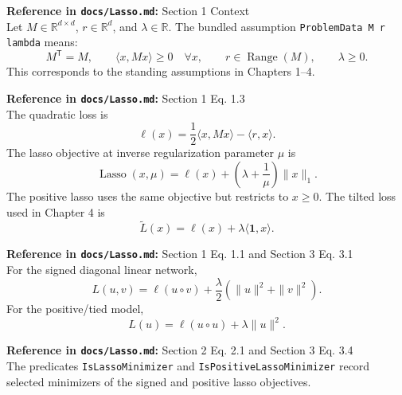 \begin{definition}\label{def:lassoProblemData}
  \textbf{Reference in \texttt{docs/Lasso.md}:} Section 1 Context\\
Let $M \in \mathbb{R}^{d \times d}$, $r \in \mathbb{R}^d$, and
$\lambda \in \mathbb{R}$.
The bundled assumption \texttt{ProblemData M r lambda} means:
\[
  M^\mathsf{T}=M,
  \qquad
  \langle x, Mx\rangle \ge 0 \quad \forall x,
  \qquad
  r \in \operatorname{Range}(M),
  \qquad
  \lambda \ge 0.
\]
This corresponds to the standing assumptions in Chapters 1--4.
\end{definition}

\begin{definition}\label{def:lassoObjectives}
  \textbf{Reference in \texttt{docs/Lasso.md}:} Section 1 Eq. 1.3\\
The quadratic loss is
\[
  \ell(x) = \frac12 \langle x, Mx\rangle - \langle r, x\rangle.
\]
The lasso objective at inverse regularization parameter $\mu$ is
\[
  \operatorname{Lasso}(x,\mu)
    = \ell(x) + \left(\lambda + \frac1\mu\right)\|x\|_1.
\]
The positive lasso uses the same objective but restricts to $x \ge 0$.
The tilted loss used in Chapter 4 is
\[
  \widetilde L(x)=\ell(x)+\lambda\langle\mathbf{1},x\rangle.
\]
\end{definition}

\begin{definition}\label{def:lassoDLNObjectives}
  \textbf{Reference in \texttt{docs/Lasso.md}:} Section 1 Eq. 1.1 and Section 3 Eq. 3.1\\
For the signed diagonal linear network,
\[
  L(u,v)=\ell(u\circ v)+\frac{\lambda}{2}(\|u\|^2+\|v\|^2).
\]
For the positive/tied model,
\[
  L(u)=\ell(u\circ u)+\lambda\|u\|^2.
\]
\end{definition}

\begin{definition}\label{def:lassoMinimizers}
  \textbf{Reference in \texttt{docs/Lasso.md}:} Section 2 Eq. 2.1 and Section 3 Eq. 3.4\\
The predicates \texttt{IsLassoMinimizer} and
\texttt{IsPositiveLassoMinimizer} record selected minimizers of the signed and
positive lasso objectives.
\end{definition}

